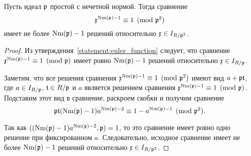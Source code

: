\documentclass[_00_dissertation.tex]{subfiles}
\begin{document}
\begin{proposition}\label{proposition:miller_criteria_character}
    Пусть идеал $\mathfrak{p}$ простой с нечетной нормой.
    Тогда сравнение
    \begin{equation*}
        \mathfrak{x}^{\textrm{Nm}(\mathfrak{p}) - 1} \equiv 1 \pmod{\mathfrak{p}^2}
    \end{equation*}
    имеет не более $\textrm{Nm}(\mathfrak{p}) - 1$ решений относительно $\mathfrak{x} \in I_{R/\mathfrak{p}^2}$.
\end{proposition}
\begin{proof}
    Из утверждения~\ref{statement:euler_function} следует, что сравнение $\mathfrak{x}^{\textrm{Nm}(\mathfrak{p}) - 1} \equiv 1 \pmod{\mathfrak{p}}$ имеет ровно $\textrm{Nm}(\mathfrak{p}) - 1$ решений относительно $\mathfrak{x} \in I_{R/\mathfrak{p}}$.
    
    Заметим, что все решения сравнения $\mathfrak{x}^{\textrm{Nm}(\mathfrak{p}) - 1} \equiv 1 \pmod{\mathfrak{p}^2}$ имеют вид $a + \mathfrak{p}\mathfrak{t}$, где $a \in I_{R/\mathfrak{p}}$, $\mathfrak{t} \in R/\mathfrak{p}$ и $a$ является решением сравнения $\mathfrak{x}^{\textrm{Nm}(\mathfrak{p}) - 1} \equiv 1 \pmod{\mathfrak{p}}$.
    Подставим этот вид в сравнение, раскроем скобки и получим сравнение
    \begin{equation*}
        \mathfrak{p}\mathfrak{t}(\textrm{Nm}(\mathfrak{p}) - 1)a^{\textrm{Nm}(\mathfrak{p}) - 2} \equiv 1 - a^{\textrm{Nm}(\mathfrak{p}) - 1} \pmod{\mathfrak{p}^2}.
    \end{equation*}
    
    Так как $((\textrm{Nm}(\mathfrak{p}) - 1)a^{\textrm{Nm}(\mathfrak{p}) - 2}, \mathfrak{p}) = 1$, то это сравнение имеет ровно одно решение при фиксированном $a$.
    Следовательно, исходное сравнение имеет не более $\textrm{Nm}(\mathfrak{p}) - 1$ решений относительно $\mathfrak{x} \in I_{R/\mathfrak{p}^2}$.
\end{proof}
\end{document}
